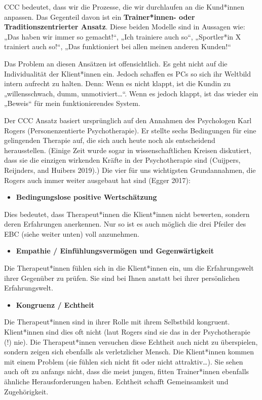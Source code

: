 \documentclass[
  letterpaper,
  DIV=11,
  numbers=noendperiod]{scrreprt}
\providecommand{\tightlist}{%
  \setlength{\itemsep}{0pt}\setlength{\parskip}{0pt}}
\begin{document}
CCC bedeutet, dass wir die Prozesse, die wir durchlaufen an die
Kund*innen anpassen. Das Gegenteil davon ist ein \textbf{Trainer*innen-
oder Traditionszentrierter Ansatz}. Diese beiden Modelle sind in
Aussagen wie: „Das haben wir immer so gemacht!{}``, „Ich trainiere auch
so``, „Sportler*in X trainiert auch so!{}``, „Das funktioniert bei allen
meinen anderen Kunden!{}``

Das Problem an diesen Ansätzen ist offensichtlich. Es geht nicht auf die
Individualität der Klient*innen ein. Jedoch schaffen es PCs so sich ihr
Weltbild intern aufrecht zu halten. Denn: Wenn es nicht klappt, ist die
Kundin zu „willensschwach, dumm, unmotiviert\ldots``. Wenn es jedoch
klappt, ist das wieder ein „Beweis`` für mein funktionierendes System.

Der CCC Ansatz basiert ursprünglich auf den Annahmen des Psychologen
Karl Rogers (Personenzentierte Psychotherapie). Er stellte sechs
Bedingungen für eine gelingenden Therapie auf, die sich auch heute noch
als entscheidend herausstellen. (Einige Zeit wurde sogar in
wissenschaftlichen Kreisen diskutiert, dass sie die einzigen wirkenden
Kräfte in der Psychotherapie sind (Cuijpers, Reijnders, and Huibers
2019).) Die vier für uns wichtigsten Grundannahmen, die Rogers auch
immer weiter ausgebaut hat sind (Egger 2017):

\begin{itemize}
\tightlist
\item
  \textbf{Bedingungslose positive Wertschätzung}
\end{itemize}

Dies bedeutet, dass Therapeut*innen die Klient*innen nicht bewerten,
sondern deren Erfahrungen anerkennen. Nur so ist es auch möglich die
drei Pfeiler des EBC (siehe weiter unten) voll anzunehmen.

\begin{itemize}
\tightlist
\item
  \textbf{Empathie / Einfühlungsvermögen und Gegenwärtigkeit}
\end{itemize}

Die Therapeut*innen fühlen sich in die Klient*innen ein, um die
Erfahrungswelt ihrer Gegenüber zu prüfen. Sie sind bei Ihnen anstatt bei
ihrer persönlichen Erfahrungswelt.

\begin{itemize}
\tightlist
\item
  \textbf{Kongruenz / Echtheit}
\end{itemize}

Die Therapeut*innen sind in ihrer Rolle mit ihrem Selbstbild kongruent.
Klient*innen sind dies oft nicht (laut Rogers sind sie das in der
Psychotherapie (!) nie). Die Therapeut*innen versuchen diese Echtheit
auch nicht zu überspielen, sondern zeigen sich ebenfalls als
verletzlicher Mensch. Die Klient*innen kommen mit einem Problem (sie
fühlen sich nicht fit oder nicht attraktiv\ldots). Sie sehen auch oft zu
anfangs nicht, dass die meist jungen, fitten Trainer*innen ebenfalls
ähnliche Herausforderungen haben. Echtheit schafft Gemeinsamkeit und
Zugehörigkeit.
\end{document}
